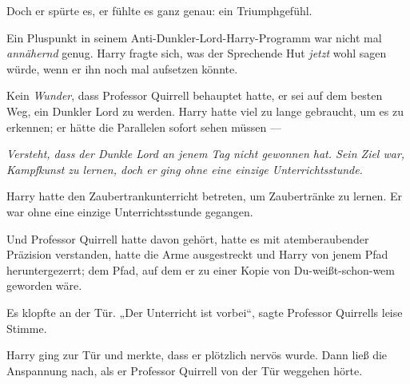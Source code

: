 Doch er spürte es, er fühlte es ganz genau: ein Triumphgefühl.

Ein Pluspunkt in seinem Anti-Dunkler-Lord-Harry-Programm war nicht mal \emph{annähernd} genug. Harry fragte sich, was der Sprechende Hut \emph{jetzt} wohl sagen würde, wenn er ihn noch mal aufsetzen könnte.

Kein \emph{Wunder}, dass Professor Quirrell behauptet hatte, er sei auf dem besten Weg, ein Dunkler Lord zu werden. Harry hatte viel zu lange gebraucht, um es zu erkennen; er hätte die Parallelen sofort sehen müssen —

\emph{Versteht, dass der Dunkle Lord an jenem Tag nicht gewonnen hat. Sein Ziel war, Kampfkunst zu lernen, doch er ging ohne eine einzige Unterrichtsstunde.}

Harry hatte den Zaubertrankunterricht betreten, um Zaubertränke zu lernen. Er war ohne eine einzige Unterrichtsstunde gegangen.

Und Professor Quirrell hatte davon gehört, hatte es mit atemberaubender Präzision verstanden, hatte die Arme ausgestreckt und Harry von jenem Pfad heruntergezerrt; dem Pfad, auf dem er zu einer Kopie von Du-weißt-schon-wem geworden wäre.

Es klopfte an der Tür.
„Der Unterricht ist vorbei“, sagte Professor Quirrells leise Stimme.

Harry ging zur Tür und merkte, dass er plötzlich nervös wurde. Dann ließ die Anspannung nach, als er Professor Quirrell von der Tür weggehen hörte.

